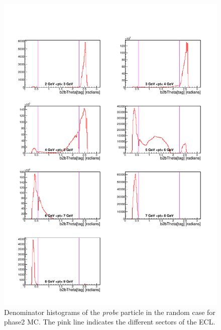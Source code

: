 \documentclass[a4paper,11pt,twosided,final,german,openbib,pdftex,listof=totoc,bibliography=totoc]{scrbook}
\begin{document}
\begin{appendix}
\begin{figure}[!htbp]
	\centering
	\includegraphics[width=\textwidth]{Plots/master/xPMThetaRandomD_MC}
	\caption[Momentum $\theta$ Random Denominator Histogram Phase2 MC]{Denominator histograms of the \textit{probe} particle in the random case for phase2 MC. The pink line indicates the different sectors of the ECL.}
	\label{plt:PMThetaRandomD_MC}
\end{figure}



\end{appendix}
\end{document}
